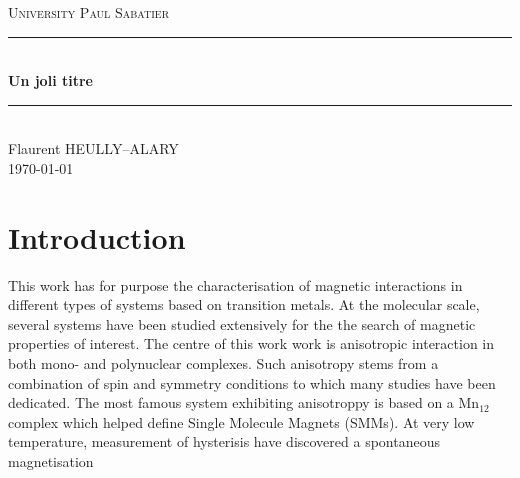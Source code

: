 \documentclass[10pt]{report}
\numberwithin{equation}{section}
\newcommand{\noun}[1]{\textsc{#1}}
\begin{document}

\begin{titlepage}
\newcommand{\HRule}{\rule{\linewidth}{0.5mm}}
\center
\textsc{\LARGE
University \noun{Paul Sabatier}
} \\[1cm]
\HRule\\[0.4cm]
{ \huge \bfseries Un joli titre \\[0.15cm] }
\HRule\\[1.5cm]
Flaurent HEULLY--ALARY
\\[1cm]
\today \\ [1cm]
\end{titlepage}
\begin{center}
\thispagestyle{plain}
\par\end{center}
\large
\tableofcontents
\newpage
\chapter{Introduction}

This work has for purpose the characterisation of magnetic interactions in different types of systems based on transition metals.
At the molecular scale, several systems have been studied extensively for the the search of magnetic properties of interest.
The centre of this work work is anisotropic interaction in both mono- and polynuclear complexes. 
Such anisotropy stems from a combination of spin and symmetry conditions to which many studies have been dedicated.
The most famous system exhibiting anisotroppy is based on a Mn$_{12}$ complex which helped define Single Molecule Magnets (SMMs).
At very low temperature, measurement of hysterisis have discovered a spontaneous magnetisation 
\end{document}
